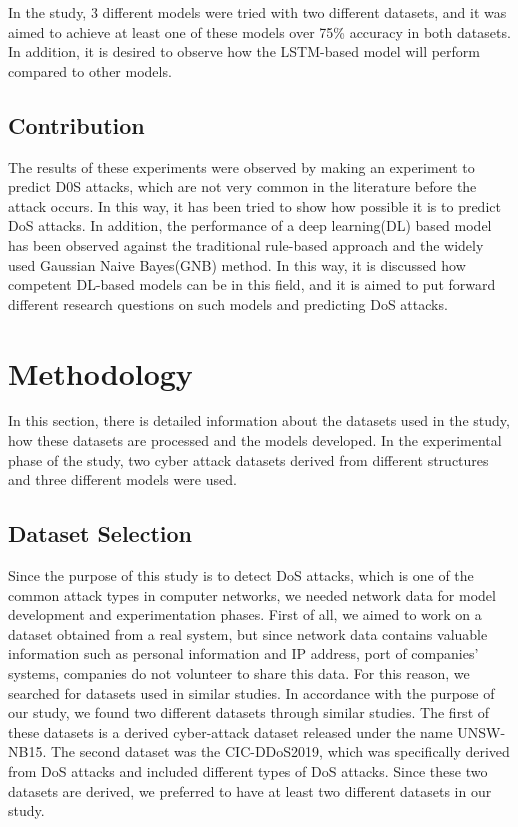 \documentclass{article}
\begin{document}
In the study, 3 different models were tried with two different datasets, and it was aimed to achieve at least one of these models over 75\% accuracy in both datasets. In addition, it is desired to observe how the LSTM-based model will perform compared to other models.

\subsection{Contribution}

The results of these experiments were observed by making an experiment to predict D0S attacks, which are not very common in the literature before the attack occurs. In this way, it has been tried to show how possible it is to predict DoS attacks. In addition, the performance of a deep learning(DL) based model has been observed against the traditional rule-based approach and the widely used Gaussian Naive Bayes(GNB) method. In this way, it is discussed how competent DL-based models can be in this field, and it is aimed to put forward different research questions on such models and predicting DoS attacks.

\section{Methodology}

In this section, there is detailed information about the datasets used in the study, how these datasets are processed and the models developed. In the experimental phase of the study, two cyber attack datasets derived from different structures and three different models were used.

\subsection{Dataset Selection}

Since the purpose of this study is to detect DoS attacks, which is one of the common attack types in computer networks, we needed network data for model development and experimentation phases. First of all, we aimed to work on a dataset obtained from a real system, but since network data contains valuable information such as personal information and IP address, port of companies' systems, companies do not volunteer to share this data. For this reason, we searched for datasets used in similar studies. In accordance with the purpose of our study, we found two different datasets through similar studies. The first of these datasets is a derived cyber-attack dataset released under the name UNSW-NB15. The second dataset was the CIC-DDoS2019, which was specifically derived from DoS attacks and included different types of DoS attacks. Since these two datasets are derived, we preferred to have at least two different datasets in our study. 
\end{document}
